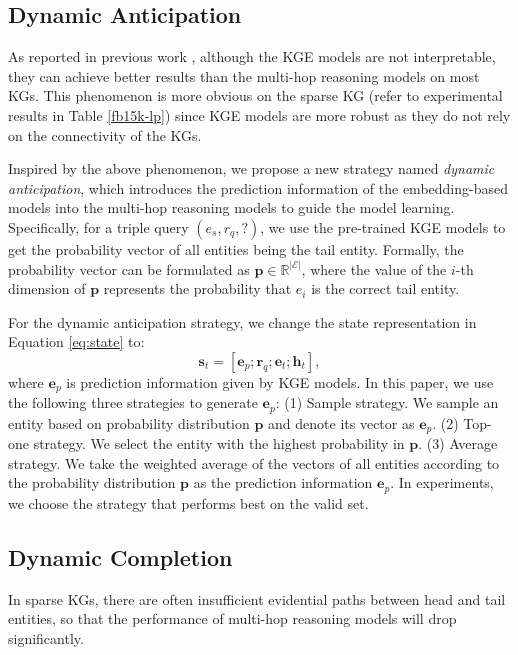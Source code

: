 \documentclass[11pt,a4paper]{article}
\begin{document}
\subsection{Dynamic Anticipation}
\label{sec:state_prediction}

As reported in previous work \cite{MINERVA,MultiHop}, although the KGE models are not interpretable, they can achieve better results than the multi-hop reasoning models on most KGs. This phenomenon is more obvious on the sparse KG (refer to experimental results in Table \ref{fb15k-lp}) since KGE models are more robust as they do not rely on the connectivity of the KGs.

Inspired by the above phenomenon, we propose a new strategy named \textit{dynamic anticipation}, which introduces the prediction information of the embedding-based models into the multi-hop reasoning models to guide the model learning. Specifically, for a triple query $(e_s, r_q, ?)$, we use the pre-trained KGE models to get the probability vector of all entities being the tail entity. Formally, the probability vector can be formulated as $\mathbf{p} \in \mathbb{R}^{|\mathcal{E}|}$, where the value of the $i$-th dimension of $\mathbf{p}$ represents the probability that $e_i$ is the correct tail entity.

For the dynamic anticipation strategy, we change the state representation in Equation \ref{eq:state} to:
\begin{equation}
  \mathbf{s}_t = [\mathbf{e}_p; \mathbf{r}_q; \mathbf{e}_t; \mathbf{h}_t] ,
\end{equation}
where $\mathbf{e}_p$ is prediction information given by KGE models. In this paper, we use the following three strategies to generate $\mathbf{e}_p$: (1) Sample strategy. We sample an entity based on probability distribution $\mathbf{p}$ and denote its vector as $\mathbf{e}_p$. (2) Top-one strategy. We select the entity with the highest probability in $\mathbf{p}$. (3) Average strategy. We take the weighted average of the vectors of all entities according to the probability distribution $\mathbf{p}$ as the prediction information $\mathbf{e}_p$. 
In experiments, we choose the strategy that performs best on the valid set.

\subsection{Dynamic Completion}
\label{sec:action_selection}

In sparse KGs, there are often insufficient evidential paths between head and tail entities, so that the performance of multi-hop reasoning models will drop significantly. 
\end{document}
